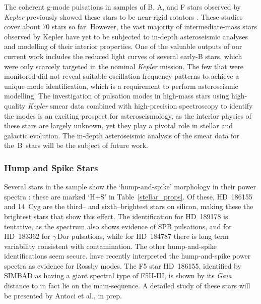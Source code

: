 \documentclass[a4paper,fleqn,usenatbib]{mnras}
\newcommand{\kepler}{\textit{Kepler}\xspace}
\newcommand{\gaia}{\textit{Gaia}\xspace}
\begin{document}
The coherent g-mode pulsations in samples of B, A, and F stars observed by \kepler previously showed these stars to be near-rigid rotators \citep{kurtz2014,saio15,triana15,vanreeth15,vanreeth16,vanreeth18,murphy16,schmid16,moravveji16,ouazzani17,papics17,aerts17,szewczuk18,2018arXiv180907779A}. These studies cover about 70 stars so far. However, the vast majority of intermediate-mass stars observed by Kepler have yet to be subjected to in-depth asteroseismic analyses and modelling of their interior properties. One of the valuable outputs of our current work includes the reduced light curves of several early-B stars, which were only scarcely targeted in the nominal \kepler mission. The few that were monitored did not reveal suitable oscillation frequency patterns to achieve a unique mode identification, which is a requirement to perform asteroseismic modelling. The investigation of pulsation modes in high-mass stars using high-quality \kepler smear data combined with high-precision spectroscopy to identify the modes \citep[Chapter 6]{aertsbook} is an exciting prospect for asteroseismology, as the interior physics of these stars are largely unknown, yet they play a pivotal role in stellar and galactic evolution. The in-depth asteroseismic analysis of the smear data for the~B~stars will be the subject of future work.

\subsubsection{Hump and Spike Stars}
\label{hs}

Several stars in the sample show the `hump-and-spike' morphology in their power spectra \citep[][a broad `hump' of low-amplitude oscillations dominated by one high amplitude coherent oscillation toward the high frequency end of this band]{2013MNRAS.431.2240B,2014MNRAS.441.3543B,2017MNRAS.467.1830B,2018MNRAS.474.2774S}: these are marked `H+S' in Table~\ref{stellar_props}.
Of these, HD~186155 and 14~Cyg are the third-- and sixth--brightest stars on silicon, making these the brightest stars that show this effect. The identification for HD~189178 is tentative, as the spectrum also shows evidence of SPB pulsations, and for HD~183362 for $\gamma$\,Dor pulsations, while for HD~184787 there is long term variability consistent with contamination. The other hump-and-spike identifications seem secure. \citet{2018MNRAS.474.2774S} have recently interpreted the hump-and-spike power spectra as evidence for Rossby modes. The F5 star HD~186155, identified by SIMBAD as having a giant spectral type of F5II-III, is shown by its \gaia distance to in fact lie on the main-sequence. A detailed study of these stars will be presented by Antoci et al., in prep.
\end{document}
